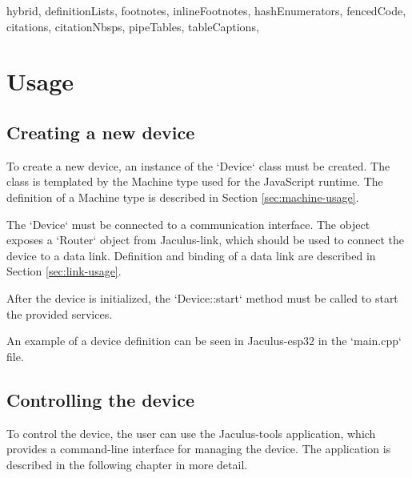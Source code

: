 \begin{markdown*}{%
  hybrid,
  definitionLists,
  footnotes,
  inlineFootnotes,
  hashEnumerators,
  fencedCode,
  citations,
  citationNbsps,
  pipeTables,
  tableCaptions,
}
\section{Usage}

\subsection{Creating a new device}

To create a new device, an instance of the `Device` class must be created. The class is templated by the Machine type used for the JavaScript runtime. The definition of a Machine type is described in Section \ref{sec:machine-usage}.

The `Device` must be connected to a communication interface. The object exposes a `Router` object from Jaculus-link, which should be used to connect the device to a data link. Definition and binding of a data link are described in Section \ref{sec:link-usage}.

After the device is initialized, the `Device::start` method must be called to start the provided services.

An example of a device definition can be seen in Jaculus-esp32 in the `main.cpp` file.

\subsection{Controlling the device}

To control the device, the user can use the Jaculus-tools application, which provides a command-line interface for managing the device. The application is described in the following chapter in more detail.


\end{markdown*}
